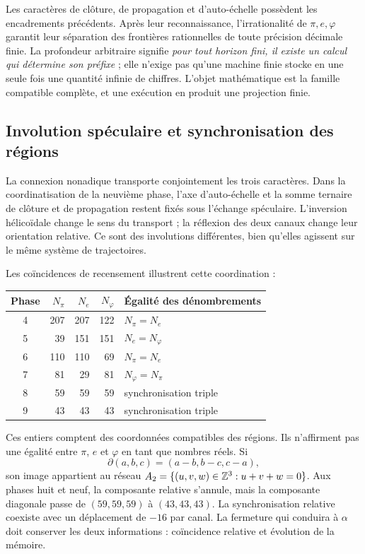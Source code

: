 Les caractères de clôture, de propagation et d’auto-échelle possèdent les encadrements précédents. Après leur reconnaissance, l’irrationalité de \(\pi,e,\varphi\) garantit leur séparation des frontières rationnelles de toute précision décimale finie. La profondeur arbitraire signifie \emph{pour tout horizon fini, il existe un calcul qui détermine son préfixe} ; elle n’exige pas qu’une machine finie stocke en une seule fois une quantité infinie de chiffres. L’objet mathématique est la famille compatible complète, et une exécution en produit une projection finie.

\subsection{Involution spéculaire et synchronisation des régions}

La connexion nonadique transporte conjointement les trois caractères. Dans la coordinatisation de la neuvième phase, l'axe d'auto-échelle et la somme ternaire de clôture et de propagation restent fixés sous l'échange spéculaire. L'inversion hélicoïdale change le sens du transport ; la réflexion des deux canaux change leur orientation relative. Ce sont des involutions différentes, bien qu'elles agissent sur le même système de trajectoires.

Les coïncidences de recensement illustrent cette coordination :
\begin{center}
\begin{tabular}{@{}c rrr l@{}}\toprule
Phase&\(N_\pi\)&\(N_e\)&\(N_\varphi\)&Égalité des dénombrements\\\midrule
4&207&207&122&\(N_\pi=N_e\)\\
5&39&151&151&\(N_e=N_\varphi\)\\
6&110&110&69&\(N_\pi=N_e\)\\
7&81&29&81&\(N_\varphi=N_\pi\)\\
8&59&59&59&synchronisation triple\\
9&43&43&43&synchronisation triple\\\bottomrule
\end{tabular}
\end{center}
Ces entiers comptent des coordonnées compatibles des régions. Ils n'affirment pas une égalité entre \(\pi\), \(e\) et \(\varphi\) en tant que nombres réels. Si
\[
 \partial(a,b,c)=(a-b,b-c,c-a),
\]
son image appartient au réseau \(A_2=\{(u,v,w)\in\mathbb Z^3:u+v+w=0\}\). Aux phases huit et neuf, la composante relative s'annule, mais la composante diagonale passe de \((59,59,59)\) à \((43,43,43)\). La synchronisation relative coexiste avec un déplacement de \(-16\) par canal. La fermeture qui conduira à \(\alpha\) doit conserver les deux informations : coïncidence relative et évolution de la mémoire.

